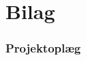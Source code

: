 \part{Bilag}
\section{Projektoplæg}

\begin{figure}[th!]
\centering

\end{figure}
\newpage
\begin{figure}[th!]
\centering

\end{figure}

